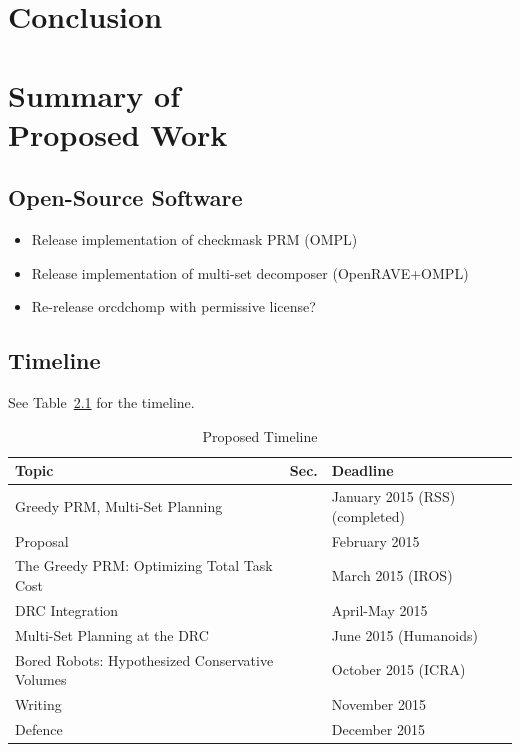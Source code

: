 \documentclass{report}
\begin{document}
\newpage
\chapter{Conclusion}


\newpage
\chapter[Summary of Proposed Work]{Summary of\\Proposed Work}

\section{Open-Source Software}

\begin{itemize}
\item Release implementation of checkmask PRM (OMPL)
\item Release implementation of multi-set decomposer (OpenRAVE+OMPL)
\item Re-release orcdchomp with permissive license?
\end{itemize}

\section{Timeline}

See Table~\ref{table:timeline} for the timeline.

\begin{table}
\centering
\begin{tabular}{lll}
\hline
Topic & Sec. & Deadline \\
\hline
Greedy PRM, Multi-Set Planning & & January 2015 (RSS) (completed) \\
Proposal & & February 2015 \\
The Greedy PRM: Optimizing Total Task Cost & & March 2015 (IROS) \\
DRC Integration & & April-May 2015 \\
Multi-Set Planning at the DRC & & June 2015 (Humanoids) \\
Bored Robots: Hypothesized Conservative Volumes & & October 2015 (ICRA) \\
Writing & & November 2015 \\
Defence & & December 2015 \\
\hline
\end{tabular}
\caption{Proposed Timeline}
\label{table:timeline}
\end{table}
\end{document}
